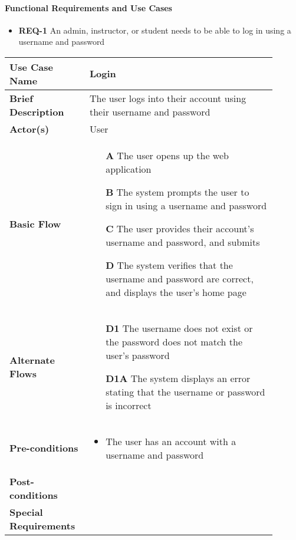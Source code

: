 \documentclass{article}
\begin{document}
\paragraph{Functional Requirements and Use Cases}

\begin{itemize}
  \item \textbf{REQ-1} An admin, instructor, or student needs to be able to log in using a username and password
\end{itemize}

\vspace{0.1in}

\begin{tabular}{| p{0.25\linewidth} | p{0.65\linewidth} |}
  \hline
  \textbf{Use Case Name} & Login \\
  \hline
  \textbf{Brief Description} & The user logs into their account using their username and password \\
  \hline
  \textbf{Actor(s)} & User \\
  \hline
  \textbf{Basic Flow} & \begin{itemize}
    \item[\textbf{A}] The user opens up the web application
    \item[\textbf{B}] The system prompts the user to sign in using a username and password
    \item[\textbf{C}] The user provides their account's username and password, and submits
    \item[\textbf{D}] The system verifies that the username and password are correct, and displays the user's home page
  \end{itemize}\\
  \hline
  \textbf{Alternate Flows} & \begin{itemize}
    \item[\textbf{D1}] The username does not exist or the password does not match the user's password
    \item[\textbf{D1A}] The system displays an error stating that the username or password is incorrect
  \end{itemize} \\
  \hline
  \textbf{Pre-conditions} & \begin{itemize}
    \item The user has an account with a username and password
  \end{itemize} \\
  \hline
  \textbf{Post-conditions} & \\
  \hline
  \textbf{Special Requirements} &  \\
  \hline
\end{tabular}
\end{document}
